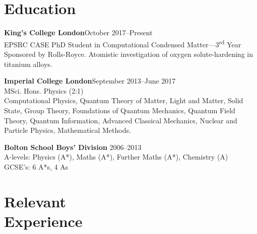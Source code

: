 \documentclass[margin]{res}
\begin{document}
 

 
\address{{\bf Present Address} \\ 27 Palfrey Place \\ London, SW8 1PB}
\address{{\bf Permanent Address} \\ 174 Crompton Way \\ Bolton, BL2 2SA \\}

 
\begin{resume} 
 

  \section{Education}
{\bf King's College London}\hfill October 2017--Present\\
EPSRC CASE PhD Student in Computational Condensed Matter---3\textsuperscript{rd} Year\\
Sponsored by Rolls-Royce.
Atomistic investigation of oxygen solute-hardening in titanium alloys. 
  
{\bf Imperial College London}\hfill September 2013--June 2017\\
MSci. Hons. Physics (2:1)\\
Computational Physics, Quantum Theory of Matter, Light and Matter, Solid State, Group Theory, Foundations of Quantum Mechanics, Quantum Field Theory, Quantum Information, Advanced Classical Mechanics, Nuclear and Particle Physics, Mathematical Methods.

{\bf Bolton School Boys' Division} \hfill 2006--2013 \\
A-levels: Physics (A*), Maths (A*), Further Maths (A*), Chemistry (A)\\
GCSE's: 6 A*s, 4 As
 

\section{Relevant\\ Experience}


\end{resume}
\end{document}
